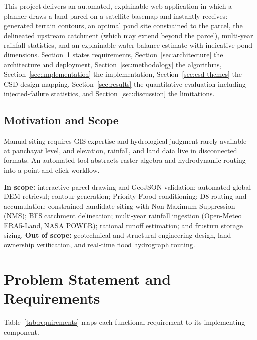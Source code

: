 \documentclass[manuscript,screen,review]{acmart}
\begin{document}
This project delivers an automated, explainable web application in which a planner draws a land parcel on a satellite basemap and instantly receives: generated terrain contours, an optimal pond site constrained to the parcel, the delineated upstream catchment (which may extend beyond the parcel), multi-year rainfall statistics, and an explainable water-balance estimate with indicative pond dimensions. Section~\ref{sec:requirements} states requirements, Section~\ref{sec:architecture} the architecture and deployment, Section~\ref{sec:methodology} the algorithms, Section~\ref{sec:implementation} the implementation, Section~\ref{sec:csd-themes} the CSD design mapping, Section~\ref{sec:results} the quantitative evaluation including injected-failure statistics, and Section~\ref{sec:discussion} the limitations.

\subsection{Motivation and Scope}
Manual siting requires GIS expertise and hydrological judgment rarely available at panchayat level, and elevation, rainfall, and land data live in disconnected formats. An automated tool abstracts raster algebra and hydrodynamic routing into a point-and-click workflow.

\textbf{In scope:} interactive parcel drawing and GeoJSON validation; automated global DEM retrieval; contour generation; Priority-Flood conditioning; D8 routing and accumulation; constrained candidate siting with Non-Maximum Suppression (NMS); BFS catchment delineation; multi-year rainfall ingestion (Open-Meteo ERA5-Land, NASA POWER); rational runoff estimation; and frustum storage sizing. \textbf{Out of scope:} geotechnical and structural engineering design, land-ownership verification, and real-time flood hydrograph routing.

\section{Problem Statement and Requirements}
\label{sec:requirements}
Table~\ref{tab:requirements} maps each functional requirement to its implementing component.
\end{document}
